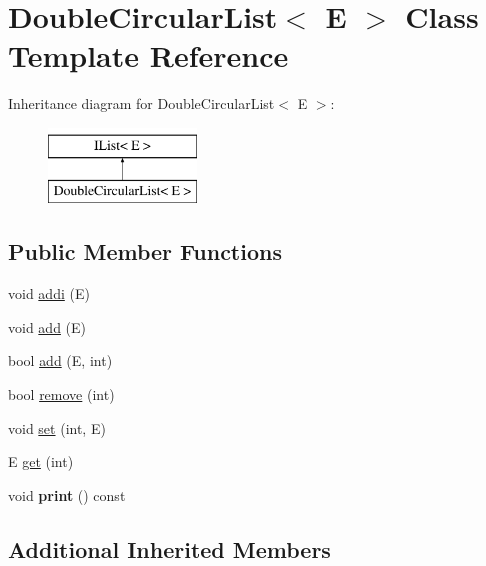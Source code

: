 \hypertarget{classDoubleCircularList}{\section{Double\-Circular\-List$<$ E $>$ Class Template Reference}
\label{classDoubleCircularList}
}
Inheritance diagram for Double\-Circular\-List$<$ E $>$\-:\begin{figure}[H]
\begin{center}
\leavevmode
\includegraphics[height=2.000000cm]{classDoubleCircularList}
\end{center}
\end{figure}
\subsection*{Public Member Functions}
\begin{DoxyCompactItemize}
\item 
void \hyperlink{classDoubleCircularList_aec3cb982a2b9def7eb254ef206101e28}{addi} (E)
\item 
void \hyperlink{classDoubleCircularList_a7691d38e77ea44d222c465f27e7d05b6}{add} (E)
\item 
bool \hyperlink{classDoubleCircularList_a6d76f7045dd9997f55c6c2feb80678da}{add} (E, int)
\item 
bool \hyperlink{classDoubleCircularList_ae7ed8b6714720cb7daafa639f232ecc3}{remove} (int)
\item 
void \hyperlink{classDoubleCircularList_a95e0f27bda1158233015ee3ff27b3ade}{set} (int, E)
\item 
E \hyperlink{classDoubleCircularList_aa00bc8fd524af1ba208f85d8816dec52}{get} (int)
\item 
\hypertarget{classDoubleCircularList_a56330353baf42afa3c49e2ade77c9e07}{void {\bfseries print} () const }\label{classDoubleCircularList_a56330353baf42afa3c49e2ade77c9e07}

\end{DoxyCompactItemize}
\subsection*{Additional Inherited Members}


